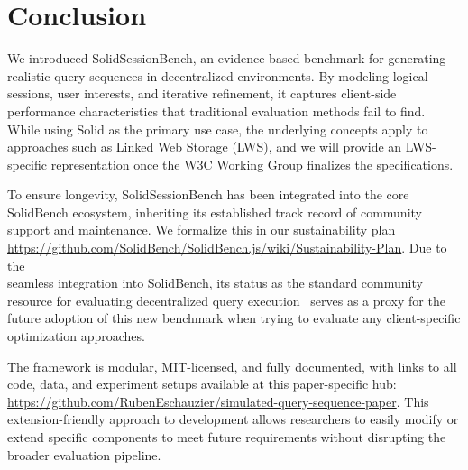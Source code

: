 \section{Conclusion}
We introduced SolidSessionBench, an evidence-based benchmark for generating realistic query sequences in decentralized environments. 
By modeling logical sessions, user interests, and iterative refinement, 
it captures client-side performance characteristics that traditional evaluation methods fail to find. 
While using Solid as the primary use case, the underlying concepts apply to approaches such as Linked Web Storage (LWS),
and we will provide an LWS-specific representation once the W3C Working Group finalizes the specifications.

To ensure longevity, SolidSessionBench has been integrated into the core SolidBench ecosystem,
inheriting its established track record of community support and maintenance.
We formalize this in our sustainability plan \url{https://github.com/SolidBench/SolidBench.js/wiki/Sustainability-Plan}.
Due to the \\ seamless integration into SolidBench, its status as the standard community resource 
for evaluating decentralized query execution~\cite{eschauzier2025revisiting,vandenbrande2025incremunica,hanski2025link,tam2024opportunities}
serves as a proxy for the future adoption of this new benchmark when trying to evaluate any client-specific optimization approaches.

The framework is modular, MIT-licensed, and fully documented, with links to all code, data, 
and experiment setups available at this paper-specific hub: \url{https://github.com/RubenEschauzier/simulated-query-sequence-paper}.  
This \\ extension-friendly approach to development allows researchers to easily modify or extend specific components to meet future requirements
without disrupting the broader evaluation pipeline.





